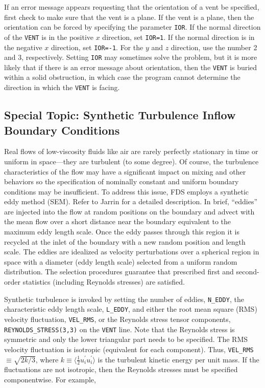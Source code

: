 \documentclass[11pt]{book}
\newcommand{\ct}{\tt\small}
\begin{document}
If an error message appears requesting that
the orientation of a vent be specified, first check to make sure that the vent is a plane.
If the vent is a plane, then the orientation can be forced by specifying the parameter {\ct IOR}.
If the normal direction of the {\ct VENT} is in the positive $x$ direction, set {\ct IOR=1}.
If the normal direction is in the negative $x$ direction, set {\ct IOR=-1}. For the $y$ and
$z$ direction, use the number 2 and 3, respectively. Setting {\ct IOR} may sometimes solve
the problem, but it is more likely that if there is an error message about orientation, then
the {\ct VENT} is buried within a solid obstruction, in which case the program cannot determine
the direction in which the {\ct VENT} is facing.

\subsection{Special Topic: Synthetic Turbulence Inflow Boundary Conditions}
\label{info:synthetic_turbulence}

Real flows of low-viscosity fluids like air are rarely perfectly stationary in time or uniform in space---they are turbulent (to some degree).
Of course, the turbulence characteristics of the flow may have a significant impact on mixing and other behaviors so the specification of nominally constant
and uniform boundary conditions may be insufficient.  To address this issue, FDS employs a synthetic eddy method (SEM).  Refer to Jarrin \cite{Jarrin:2008} for a detailed description.
In brief, ``eddies'' are injected into the flow at random positions on the boundary and advect with the mean flow over a short distance near the boundary
equivalent to the maximum eddy length scale.  Once the eddy passes through this region it is recycled at the inlet of the boundary with a new random position and length scale.
The eddies are idealized as velocity perturbations over a spherical region in space with a diameter (eddy length scale) selected from a uniform random distribution.
The selection procedures guarantee that prescribed first and second-order statistics (including Reynolds stresses) are satisfied.

Synthetic turbulence is invoked by setting the number of eddies, {\ct N\_EDDY}, the characteristic eddy length scale, {\ct L\_EDDY}, and either the root mean square (RMS)
velocity fluctuation, {\ct VEL\_RMS}, or the Reynolds stress tensor components, {\ct REYNOLDS\_STRESS(3,3)} on the {\ct VENT} line.
Note that the Reynolds stress is symmetric and only the lower triangular part needs to be specified.  The RMS velocity fluctuation is isotropic (equivalent for each component).
Thus, {\ct VEL\_RMS} $\equiv \sqrt{2k/3}$, where $k\equiv \langle\frac{1}{2}u_i^\prime u_i^\prime\rangle$ is the turbulent kinetic energy per unit mass.
If the fluctuations are not isotropic, then the Reynolds stresses must be specified componentwise.
For example,
\end{document}
